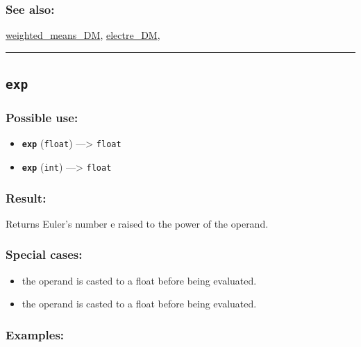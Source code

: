 \documentclass[]{book}
\providecommand{\tightlist}{%
  \setlength{\itemsep}{0pt}\setlength{\parskip}{0pt}}
\theoremstyle{definition}
\theoremstyle{definition}
\theoremstyle{definition}
\theoremstyle{remark}
\begin{document}
\subsubsection{See also:}\label{see-also-89}

\href{operators-s-to-z.html\#weighted_means_dm}{weighted\_means\_DM},
\href{operators-d-to-h.html\#electre_dm}{electre\_DM},

\begin{center}\rule{0.5\linewidth}{\linethickness}\end{center}

\subsection{\texorpdfstring{\texttt{exp}}{exp}}\label{exp}

\subsubsection{Possible use:}\label{possible-use-160}

\begin{itemize}
\tightlist
\item
  \textbf{\texttt{exp}} (\texttt{float}) ---\textgreater{}
  \texttt{float}
\item
  \textbf{\texttt{exp}} (\texttt{int}) ---\textgreater{} \texttt{float}
\end{itemize}

\subsubsection{Result:}\label{result-154}

Returns Euler's number e raised to the power of the operand.

\subsubsection{Special cases:}\label{special-cases-58}

\begin{itemize}
\tightlist
\item
  the operand is casted to a float before being evaluated.\\
\item
  the operand is casted to a float before being evaluated.
\end{itemize}

\subsubsection{Examples:}\label{examples-119}
\end{document}
